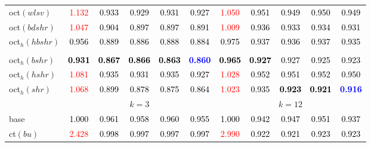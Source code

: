 \begin{tabular}[t]{l|>{}cccc>{}c|ccccc}
oct$(wlsv)$ & \textcolor{red}{1.132} & \textcolor{black}{0.933} & \textcolor{black}{0.929} & \textcolor{black}{0.931} & \textcolor{black}{0.927} & \textcolor{red}{1.050} & \textcolor{black}{0.951} & \textcolor{black}{0.949} & \textcolor{black}{0.950} & \textcolor{black}{0.949}\\
oct$(bdshr)$ & \textcolor{red}{1.047} & \textcolor{black}{0.904} & \textcolor{black}{0.897} & \textcolor{black}{0.897} & \textcolor{black}{0.891} & \textcolor{red}{1.009} & \textcolor{black}{0.936} & \textcolor{black}{0.933} & \textcolor{black}{0.934} & \textcolor{black}{0.931}\\
oct$_h(hbshr)$ & \textcolor{black}{0.956} & \textcolor{black}{0.889} & \textcolor{black}{0.886} & \textcolor{black}{0.888} & \textcolor{black}{0.884} & \textcolor{black}{0.975} & \textcolor{black}{0.937} & \textcolor{black}{0.936} & \textcolor{black}{0.937} & \textcolor{black}{0.935}\\[-1.5ex]
\hline\\[-1.5ex]
oct$_h(bshr)$ & \textcolor{black}{\textbf{0.931}} & \textcolor{black}{\textbf{0.867}} & \textcolor{black}{\textbf{0.866}} & \textcolor{black}{\textbf{0.863}} & \textcolor{blue}{\textbf{0.860}} & \textcolor{black}{\textbf{0.965}} & \textcolor{black}{\textbf{0.927}} & \textcolor{black}{0.927} & \textcolor{black}{0.925} & \textcolor{black}{0.923}\\
oct$_h(hshr)$ & \textcolor{red}{1.081} & \textcolor{black}{0.935} & \textcolor{black}{0.931} & \textcolor{black}{0.935} & \textcolor{black}{0.927} & \textcolor{red}{1.028} & \textcolor{black}{0.952} & \textcolor{black}{0.951} & \textcolor{black}{0.952} & \textcolor{black}{0.950}\\
oct$_h(shr)$ & \textcolor{red}{1.068} & \textcolor{black}{0.899} & \textcolor{black}{0.878} & \textcolor{black}{0.875} & \textcolor{black}{0.864} & \textcolor{red}{1.023} & \textcolor{black}{0.935} & \textcolor{black}{\textbf{0.923}} & \textcolor{black}{\textbf{0.921}} & \textcolor{blue}{\textbf{0.916}}\\
\addlinespace[0.3em]
\multicolumn{1}{c}{} & \multicolumn{5}{c}{\textbf{$k = 3$}} & \multicolumn{5}{c}{\textbf{$k = 12$}}\\
base & \textcolor{black}{1.000} & \textcolor{black}{0.961} & \textcolor{black}{0.958} & \textcolor{black}{0.960} & \textcolor{black}{0.955} & \textcolor{black}{1.000} & \textcolor{black}{0.942} & \textcolor{black}{0.947} & \textcolor{black}{0.951} & \textcolor{black}{0.937}\\
ct$(bu)$ & \textcolor{red}{2.428} & \textcolor{black}{0.998} & \textcolor{black}{0.997} & \textcolor{black}{0.997} & \textcolor{black}{0.997} & \textcolor{red}{2.990} & \textcolor{black}{0.922} & \textcolor{black}{0.921} & \textcolor{black}{0.923} & \textcolor{black}{0.923}\\

\end{tabular}
